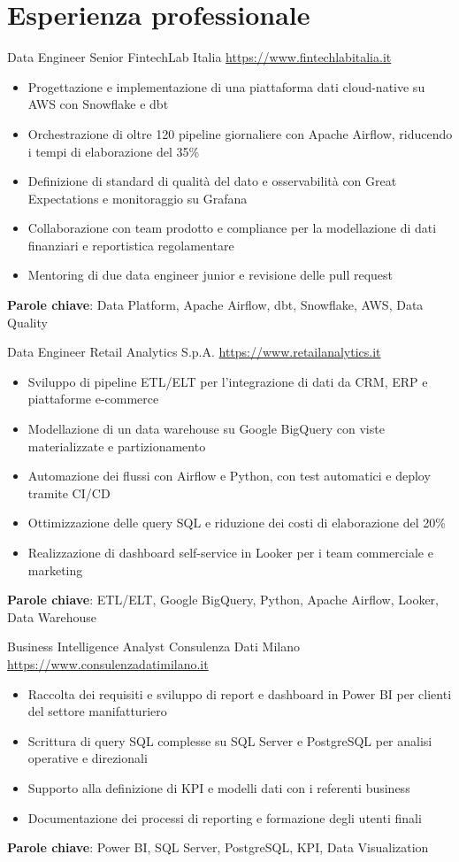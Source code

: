 \documentclass[a4paper, serif, 10pt]{moderncv}
\begin{document}
\section{Esperienza professionale}

        {Data Engineer Senior}
        {FintechLab Italia}
        {\url{https://www.fintechlabitalia.it}}
        {}
        {\begin{itemize}
\item Progettazione e implementazione di una piattaforma dati cloud-native su AWS con Snowflake e dbt
\item Orchestrazione di oltre 120 pipeline giornaliere con Apache Airflow, riducendo i tempi di elaborazione del 35\%
\item Definizione di standard di qualità del dato e osservabilità con Great Expectations e monitoraggio su Grafana
\item Collaborazione con team prodotto e compliance per la modellazione di dati finanziari e reportistica regolamentare
\item Mentoring di due data engineer junior e revisione delle pull request
\end{itemize}
\textbf{Parole chiave}: Data Platform, Apache Airflow, dbt, Snowflake, AWS, Data Quality}

        {Data Engineer}
        {Retail Analytics S.p.A.}
        {\url{https://www.retailanalytics.it}}
        {}
        {\begin{itemize}
\item Sviluppo di pipeline ETL/ELT per l'integrazione di dati da CRM, ERP e piattaforme e-commerce
\item Modellazione di un data warehouse su Google BigQuery con viste materializzate e partizionamento
\item Automazione dei flussi con Airflow e Python, con test automatici e deploy tramite CI/CD
\item Ottimizzazione delle query SQL e riduzione dei costi di elaborazione del 20\%
\item Realizzazione di dashboard self-service in Looker per i team commerciale e marketing
\end{itemize}
\textbf{Parole chiave}: ETL/ELT, Google BigQuery, Python, Apache Airflow, Looker, Data Warehouse}

        {Business Intelligence Analyst}
        {Consulenza Dati Milano}
        {\url{https://www.consulenzadatimilano.it}}
        {}
        {\begin{itemize}
\item Raccolta dei requisiti e sviluppo di report e dashboard in Power BI per clienti del settore manifatturiero
\item Scrittura di query SQL complesse su SQL Server e PostgreSQL per analisi operative e direzionali
\item Supporto alla definizione di KPI e modelli dati con i referenti business
\item Documentazione dei processi di reporting e formazione degli utenti finali
\end{itemize}
\textbf{Parole chiave}: Power BI, SQL Server, PostgreSQL, KPI, Data Visualization}
\end{document}
